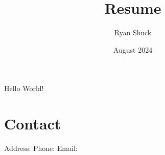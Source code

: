 \documentclass{article}
\title{Resume}
\author{Ryan Shuck}
\date{August 2024}
\begin{document}
    \maketitle
    Hello World!
    \section{Contact}
    Address:
    Phone:
    Email:
\end{document}
